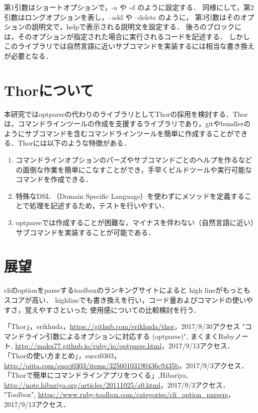 \documentclass[a4j,twocolumn,uplatex]{jsarticle}
\begin{document}
第1引数はショートオプションで，-a や -d のように設定する．
同様にして，第2引数はロングオプションを表し，--add や --delete のように，
第3引数はそのオプションの説明文で，helpで表示される説明文を設定する．
後ろのブロックには，そのオプションが指定された場合に実行されるコードを記述する\cite{MakuMakuOptParse}．
しかしこのライブラリでは自然言語に近いサブコマンドを実装するには相当な書き換えが必要となる．

\section{Thorについて}
本研究ではoptparseの代わりのライブラリとしてThorの採用を検討する．Thorは，コマンドラインツールの作成を支援するライブラリであり，gitやbundlerのようにサブコマンドを含むコマンドラインツールを簡単に作成することができる\cite{succi}．Thorには以下のような特徴がある．

\begin{enumerate}
\item コマンドラインオプションのパーズやサブコマンドごとのヘルプを作るなどの面倒な作業を簡単にこなすことができ，手早くビルドツールや実行可能なコマンドを作成できる\cite{hibariya}．
\item 特殊なDSL （Domain Specific Language）を使わずにメソッドを定義することで処理を記述するため，テストを行いやすい\cite{hibariya}．
\item optparseでは作成することが困難な，マイナスを伴わない（自然言語に近い）サブコマンドを実装することが可能である．
\end{enumerate}

\section{展望}
cliのoptionをparseするtoolboxのランキングサイトによると
high
lineがもっともスコアが高い\cite{toolbox}．
highlineでも書き換えを行い，コード量およびコマンドの使いやすさ，覚えやすさといった
使用感についての比較検討を行う．

\vspace{0.3\baselineskip}

{\small\setlength\baselineskip{10pt}	%
\begin{thebibliography}{9}
「Thor」，erikhuda，\url{https://github.com/erikhuda/thor}，2017/8/30アクセス
"コマンドライン引数によるオプションに対応する (optparse)", まくまくRubyノート, \url{http://maku77.github.io/ruby/io/optparse.html}，2017/9/13アクセス．
「Thorの使い方まとめ」，succi0303，\url{http://qiita.com/succi0303/items/32560103190436c9435b}，2017/9/3アクセス．
「Thorで簡単にコマンドラインアプリをつくる」,Hibariya, \url{http://note.hibariya.org/articles/20111025/a0.html}，2017/9/3アクセス．
 "Toolbox", \url{https://www.ruby-toolbox.com/categories/cli_option_parsers}，2017/9/13アクセス．
\end{thebibliography}
}
\end{document}

